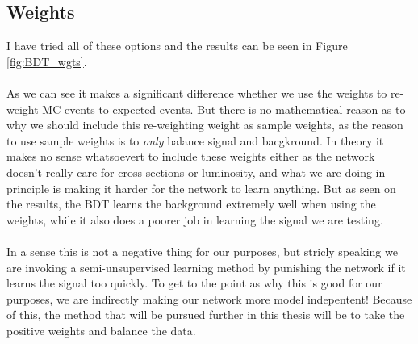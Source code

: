 \documentclass[14pt, a4paper]{book}
\begin{document}
\subsection{Weights}
I have tried all of these options and the results can be seen in Figure \ref{fig:BDT_wgts}.\\
\\As we can see it makes a significant difference whether we use the weights to re-weight MC events to expected events. But there is no mathematical reason as to why we should 
include this re-weighting weight as sample weights, as the reason to use sample weights is to \textit{only} balance signal and bacgkround. In theory it makes no sense whatsoevert to include these weights either 
as the network doesn't really care for cross sections or luminosity, and what we are doing in principle is making it harder for the network to learn anything. But as seen on the results, the BDT learns the background 
extremely well when using the weights, while it also does a poorer job in learning the signal we are testing.\\ 
\\In a sense this is not a negative thing for our purposes, but stricly speaking we are invoking a semi-unsupervised learning method by punishing the network if it learns the signal too quickly. 
To get to the point as why this is good for our purposes, we are indirectly making our network more model indepentent! Because of this, the method that will be pursued further in this thesis will be to 
take the positive weights and balance the data.
\end{document}
